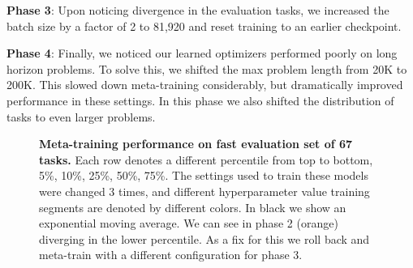 \documentclass[11pt]{article}
\begin{document}
\textbf{Phase 3}: Upon noticing divergence in the evaluation tasks, we increased the batch size by a factor of 2 to 81,920 and reset training to an earlier checkpoint.

\textbf{Phase 4}: Finally, we noticed our learned optimizers performed poorly on long horizon problems. To solve this, we shifted the max problem length from 20K to 200K. This slowed down meta-training considerably, but dramatically improved performance in these settings. In this phase we also shifted the distribution of tasks to even larger problems.



\begin{figure}[t!]
    \centering
    \caption{\textbf{Meta-training performance on fast evaluation set of 67 tasks.} Each row denotes a different percentile from top to bottom, 5\%, 10\%, 25\%, 50\%, 75\%. The settings used to train these models were changed 3 times, and different hyperparameter value training segments are denoted by different colors. In black we show an exponential moving average. We can see in phase 2 (orange) diverging in the lower percentile. As a fix for this we roll back and meta-train with a different configuration for phase 3.
    \label{fig:meta_training_eval_curves}
    }
\end{figure}
\end{document}
